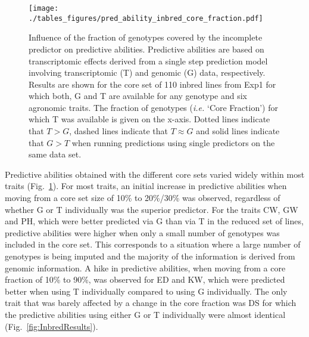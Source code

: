 \documentclass[12pt,titlepage]{article}
\begin{document}
\begin{figure}[H]
  \centering
  \texttt{[image: ./tables\_figures/pred\_ability\_inbred\_core\_fraction.pdf]}
  \caption{
  Influence of the fraction of genotypes covered by the incomplete predictor
  on predictive abilities.
  Predictive abilities are based on transcriptomic effects derived from a
  single step prediction model involving transcriptomic (T) and genomic (G)
  data, respectively.
  Results are shown for the core set of 110 inbred lines from Exp1 for
  which both, G and T are available for any genotype and six agronomic traits.
  The fraction of genotypes (\textit{i.e.} `Core Fraction') for which
  T was available is given on the x-axis.
  Dotted lines indicate that $T > G$, dashed lines indicate that $T \approx G$
  and solid lines indicate that $G > T$ when running predictions using single
  predictors on the same data set.
  }
\label{fig:core-results}
\end{figure}


Predictive abilities obtained with the different core sets varied widely within
most traits (Fig.~\ref{fig:core-results}).
For most traits, an initial increase in predictive abilities when moving
from a core set size of 10\% to 20\%/30\% was observed, regardless of whether G
or T individually was the superior predictor.
For the traits CW, GW and PH, which were better predicted via G than via T in
the reduced set of lines, predictive abilities were higher when only a small
number of genotypes was included in the core set.
This corresponds to a situation where a large number of genotypes is being 
imputed and the majority of the information is derived from genomic information.
A hike in predictive abilities, when moving from a core fraction of 10\% to 
90\%, was observed for ED and KW, which were predicted better when using T
individually compared to using G individually.
The only trait that was barely affected by a change in the core fraction was DS
for which the predictive abilities using either G or T individually were almost
identical (Fig.~\ref{fig:InbredResults}).
\end{document}
